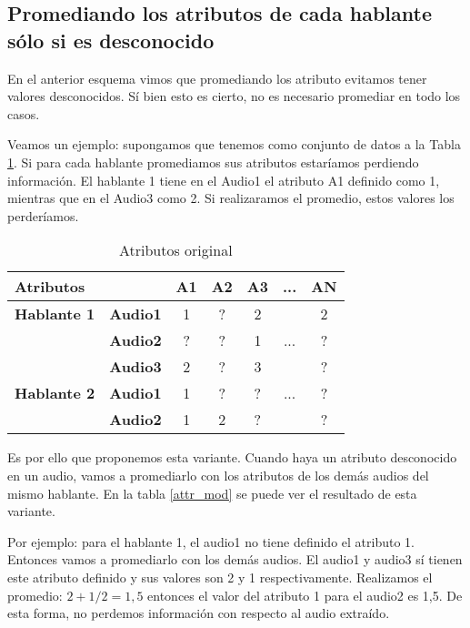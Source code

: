 \subsection{Promediando los atributos de cada hablante sólo si es desconocido}

En el anterior esquema vimos que promediando los atributo evitamos tener valores desconocidos. Sí bien esto es cierto, no es necesario promediar en todo los casos. 

Veamos un ejemplo: supongamos que tenemos como conjunto de datos a la Tabla \ref{attr_orig}. Si para cada hablante promediamos sus atributos estaríamos perdiendo información. El hablante 1 tiene en el Audio1 el atributo A1 definido como 1, mientras que en el Audio3 como 2. Si realizaramos el promedio, estos valores los perderíamos.

\begin{table}[H]
	\centering
	\begin{tabular}{|l|l|ccccc|}
		\hline
		\multicolumn{2}{|l|}{Atributos} & A1 & A2 & A3 & ... & AN \\
		\hline 
		\textbf{Hablante 1} & \textbf{Audio1} & 1 & ? & 2 & & 2\\
		& \textbf{Audio2} & ? & ? & 1 & ... & ? \\
		& \textbf{Audio3} & 2 & ? & 3 & & ? \\
		\hline
		\textbf{Hablante 2} & \textbf{Audio1} & 1 & ? & ? & ... & ? \\
		& \textbf{Audio2} & 1 & 2 & ? & & ? \\
		\hline
	\end{tabular}
	\caption{Atributos original}
	\label{attr_orig}
\end{table}

Es por ello que proponemos esta variante. Cuando haya un atributo desconocido en un audio, vamos a promediarlo con los atributos de los demás audios del mismo hablante. En la tabla \ref{attr_mod} se puede ver el resultado de esta variante. 

Por ejemplo: para el hablante 1, el audio1 no tiene definido el atributo 1. Entonces vamos a promediarlo con los demás audios. El audio1 y audio3 sí tienen este atributo definido y sus valores son 2 y 1 respectivamente. Realizamos el promedio: $ 2 + 1 / 2 = 1,5$ entonces el valor del atributo 1 para el audio2 es 1,5. De esta forma, no perdemos información con respecto al audio extraído.

